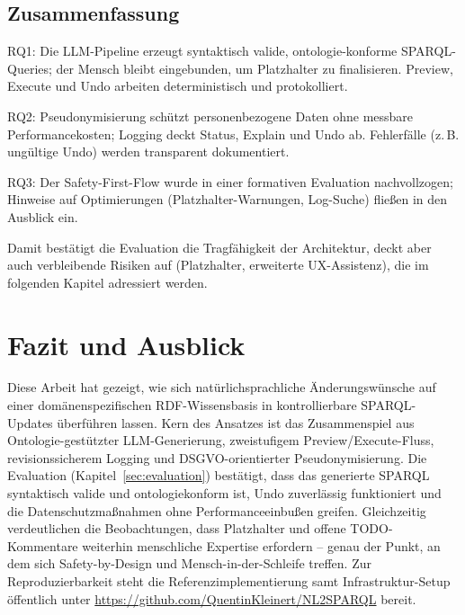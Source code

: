 \section{Zusammenfassung}

RQ1: Die LLM-Pipeline erzeugt syntaktisch valide, ontologie-konforme SPARQL-Queries; der Mensch bleibt eingebunden, um Platzhalter zu finalisieren. Preview, Execute und Undo arbeiten deterministisch und protokolliert.

RQ2: Pseudonymisierung schützt personenbezogene Daten ohne messbare Performancekosten; Logging deckt Status, Explain und Undo ab. Fehlerfälle (z.\,B. ungültige Undo) werden transparent dokumentiert.

RQ3: Der Safety-First-Flow wurde in einer formativen Evaluation nachvollzogen; Hinweise auf Optimierungen (Platzhalter-Warnungen, Log-Suche) fließen in den Ausblick ein.

Damit bestätigt die Evaluation die Tragfähigkeit der Architektur, deckt aber auch verbleibende Risiken auf (Platzhalter, erweiterte UX-Assistenz), die im folgenden Kapitel adressiert werden.




\chapter{Fazit und Ausblick}
\label{sec:fazit}

Diese Arbeit hat gezeigt, wie sich natürlichsprachliche Änderungswünsche auf einer domänenspezifischen RDF-Wissensbasis in kontrollierbare SPARQL-Updates überführen lassen. Kern des Ansatzes ist das Zusammenspiel aus Ontologie-gestützter LLM-Generierung, zweistufigem Preview/Execute-Fluss, revisionssicherem Logging und DSGVO-orientierter Pseudonymisierung. Die Evaluation (Kapitel~\ref{sec:evaluation}) bestätigt, dass das generierte SPARQL syntaktisch valide und ontologiekonform ist, Undo zuverlässig funktioniert und die Datenschutzmaßnahmen ohne Performanceeinbußen greifen. Gleichzeitig verdeutlichen die Beobachtungen, dass Platzhalter und offene TODO-Kommentare weiterhin menschliche Expertise erfordern – genau der Punkt, an dem sich Safety-by-Design und Mensch-in-der-Schleife treffen.
Zur Reproduzierbarkeit steht die Referenzimplementierung samt Infrastruktur-Setup öffentlich unter \url{https://github.com/QuentinKleinert/NL2SPARQL} bereit.

